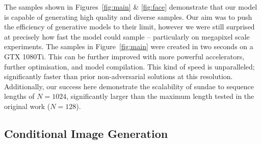 The samples shown in Figures~\ref{fig:main} \& \ref{fig:face} demonstrate
that our model is capable of generating high quality and diverse samples. Our
aim was to push the efficiency of generative models to their limit, however we
were still surprised at precisely how fast the model could sample --
particularly on megapixel scale experiments. The samples in
Figure~\ref{fig:main} were created in two seconds on a GTX 1080Ti. This can be
further improved with more powerful accelerators, further optimisation, and
model compilation. This kind of speed is unparalleled; significantly faster than
prior non-adversarial solutions at this resolution. Additionally, our success
here demonstrate the scalability of \gls{sundae} to sequence lengths of
$N=1024$, significantly larger than the maximum length tested in the original
work ($N=128$).

\subsection{Conditional Image Generation}
\label{subsec:evaluationConditional}

